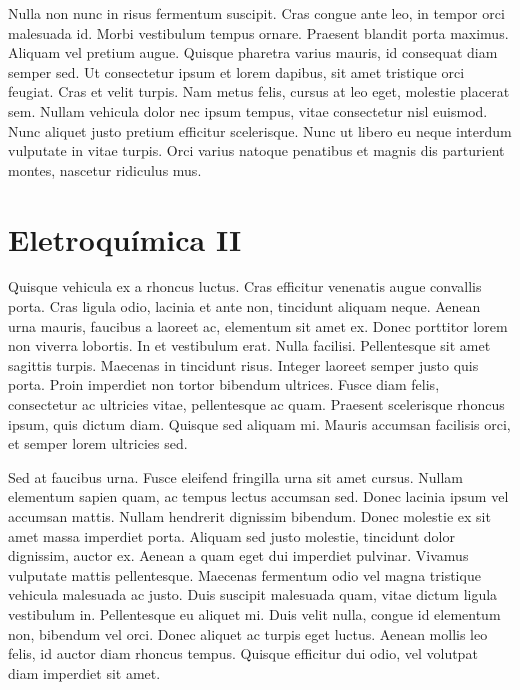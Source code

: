 \documentclass[12pt]{article}
\begin{document}
\begin{multicols*}{2}
        Nulla non nunc in risus fermentum suscipit. Cras congue ante leo, in tempor orci malesuada id. Morbi 
        vestibulum tempus ornare. Praesent blandit porta maximus. Aliquam vel pretium augue. Quisque pharetra 
        varius mauris, id consequat diam semper sed. Ut consectetur ipsum et lorem dapibus, sit amet tristique 
        orci feugiat. Cras et velit turpis. Nam metus felis, cursus at leo eget, molestie placerat sem. Nullam 
        vehicula dolor nec ipsum tempus, vitae consectetur nisl euismod. Nunc aliquet justo pretium efficitur 
        scelerisque. Nunc ut libero eu neque interdum vulputate in vitae turpis. Orci varius natoque penatibus 
        et magnis dis parturient montes, nascetur ridiculus mus. 
    

        \section*{Eletroquímica II}

        Quisque vehicula ex a rhoncus luctus. Cras efficitur venenatis augue convallis porta. Cras ligula odio, 
        lacinia et ante non, tincidunt aliquam neque. Aenean urna mauris, faucibus a laoreet ac, elementum sit 
        amet ex. Donec porttitor lorem non viverra lobortis. In et vestibulum erat. Nulla facilisi.
         Pellentesque sit amet sagittis turpis. Maecenas in tincidunt risus. Integer laoreet semper justo quis 
         porta. Proin imperdiet non tortor bibendum ultrices. Fusce diam felis, consectetur ac ultricies vitae, 
         pellentesque ac quam. Praesent scelerisque rhoncus ipsum, quis dictum diam. Quisque sed aliquam mi.
         Mauris accumsan facilisis orci, et semper lorem ultricies sed.

        Sed at faucibus urna. Fusce eleifend fringilla urna sit amet cursus. Nullam elementum sapien quam, ac 
        tempus lectus accumsan sed. Donec lacinia ipsum vel accumsan mattis. Nullam hendrerit dignissim bibendum.
        Donec molestie ex sit amet massa imperdiet porta. Aliquam sed justo molestie, tincidunt dolor dignissim, 
        auctor ex. Aenean a quam eget dui imperdiet pulvinar. Vivamus vulputate mattis pellentesque. Maecenas 
        fermentum odio vel magna tristique vehicula malesuada ac justo. Duis suscipit malesuada quam, vitae 
        dictum ligula vestibulum in. Pellentesque eu aliquet mi. Duis velit nulla, congue id elementum non, 
        bibendum vel orci. Donec aliquet ac turpis eget luctus. Aenean mollis leo felis, id auctor diam rhoncus 
        tempus. Quisque efficitur dui odio, vel volutpat diam imperdiet sit amet. 


\end{multicols*}
\end{document}
